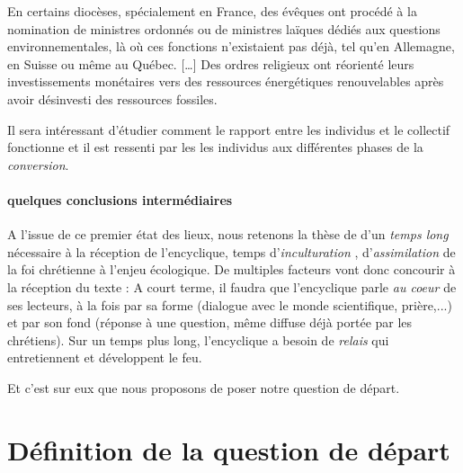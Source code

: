 \begin{singlequote}
    En certains diocèses, spécialement en France, des évêques ont procédé à la nomination de ministres ordonnés ou de ministres laïques dédiés aux questions environnementales, là où ces fonctions n'existaient pas déjà, tel qu'en Allemagne, en Suisse ou même au Québec. [\ldots] Des ordres religieux ont réorienté leurs investissements monétaires vers des ressources énergétiques renouvelables après avoir désinvesti des ressources fossiles. 
 
\cite{revol_reception_2017}
\end{singlequote}

Il sera intéressant d'étudier comment le rapport entre les individus et le collectif fonctionne et il est ressenti par les les individus aux différentes phases de la \textit{conversion}.
 

\paragraph{quelques conclusions intermédiaires}

 A l'issue de ce premier état des lieux, nous retenons la thèse de \cite{revol_reception_2017} d'un \textit{temps long} nécessaire à la réception de l'encyclique, temps d'\textit{inculturation} , d'\textit{assimilation} de la foi chrétienne à l'enjeu écologique. 
De multiples facteurs vont donc concourir à la réception du texte : A court terme, il faudra  que l'encyclique parle \textit{au coeur} de ses lecteurs, à la fois par sa forme (dialogue avec le monde scientifique, prière,...) et par son fond (réponse à une question, même diffuse déjà portée par les chrétiens).
Sur un temps plus long, l'encyclique a besoin de \textit{relais} qui entretiennent et développent le feu. 

Et c'est sur eux que nous proposons de poser notre question de départ. 


\section{Définition de la  question de départ}


